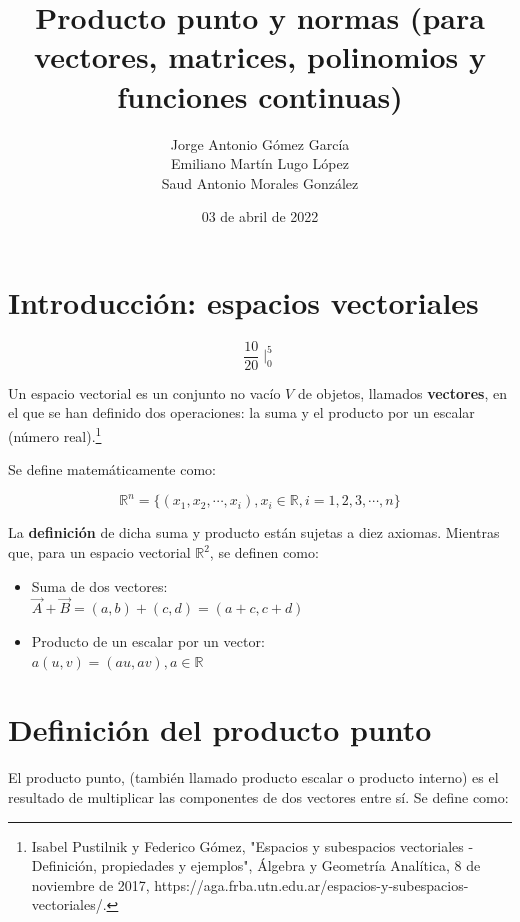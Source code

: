 \documentclass{article}
\title{Producto punto y normas (para vectores, matrices, polinomios y funciones continuas)}
\author{
    Jorge Antonio Gómez García \\
    Emiliano Martín Lugo López \\
    Saud Antonio Morales González}
\date{03 de abril de 2022}
\begin{document}
\maketitle

\section{Introducción: espacios vectoriales}

\begin{equation}
    \frac{10}{20} \mid_0^5
\end{equation}    

    Un espacio vectorial es un conjunto no vacío $V$ de objetos, llamados \textbf{vectores}, en el que se han definido dos operaciones: la suma y el producto por un escalar (número real).\footnote{Isabel Pustilnik y Federico Gómez, "Espacios y subespacios vectoriales - Definición, propiedades y ejemplos", Álgebra y Geometría Analítica, 8 de noviembre de 2017, https://aga.frba.utn.edu.ar/espacios-y-subespacios-vectoriales/.}

    Se define matemáticamente como:

    \begin{equation*}
        \mathbb{R}^n=\{ (x_1, x_2, \dotsb, x_i), x_i \in \mathbb{R}, i=1,2,3,\dotsb,n \}
    \end{equation*}

    La \textbf{definición} de dicha suma y producto están sujetas a diez axiomas. Mientras que, para un espacio vectorial $\mathbb{R}^2$, se definen como:
    \begin{itemize}
        \item Suma de dos vectores: \\
            $ {\vec{A} + \vec{B}= (a,b) + (c,d) = (a+c, c+d)} $
                
        \item Producto de un escalar por un vector: \\
            $ {a(u, v) = (au, av), a \in \mathbb{R}} $
                
    \end{itemize}

\section{Definición del producto punto}

    El producto punto, (también llamado producto escalar o producto interno) es el resultado de multiplicar las componentes de dos vectores entre sí. Se define como:
\end{document}
